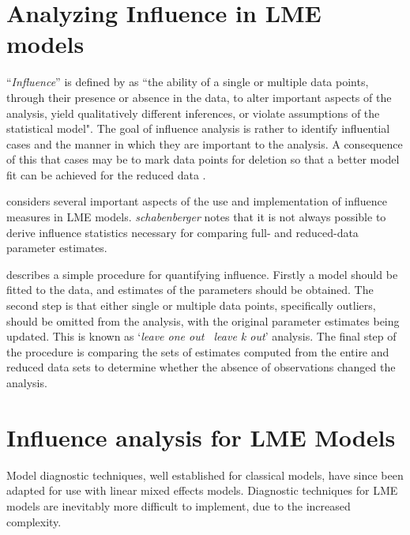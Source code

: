 \documentclass[12pt, a4paper]{report}
\theoremstyle{plain}
\theoremstyle{definition}
\theoremstyle{remark}
\begin{document}

\section{Analyzing Influence in LME models}
``\textit{Influence}” is defined by \citet{schab} as ``the ability of a single or multiple data points, through their presence
or absence in the data, to alter important aspects of the analysis, yield qualitatively different inferences, or
violate assumptions of the statistical model". The goal of influence analysis is rather to identify influential cases and the manner in
which they are important to the analysis. A consequence of this that cases may be to mark data points for deletion so that a better model fit can be achieved for the reduced data \citep{schab}.  



\citet{schab} considers several important aspects of the use and implementation of influence measures in LME models. \textit{schabenberger} notes that it is not always possible to
derive influence statistics necessary for comparing full- and reduced-data parameter estimates. 

\citet{schab} describes a simple procedure for quantifying influence. Firstly a model should be fitted to the data, and
estimates of the parameters should be obtained. The second step is that either single or multiple data points, specifically outliers,
should be omitted from the analysis, with the original parameter estimates being updated. This is known as `\textit{leave one out \ leave k out}' analysis. The final step of the procedure is comparing the 	sets of estimates computed from the entire and reduced data sets to determine whether the absence of observations changed the
analysis.		


\section{Influence analysis for LME Models} %


Model diagnostic techniques, well established for classical models, have since been adapted for use with linear mixed effects models. Diagnostic techniques for LME models are inevitably more difficult to implement, due to the increased complexity.
\end{document}

